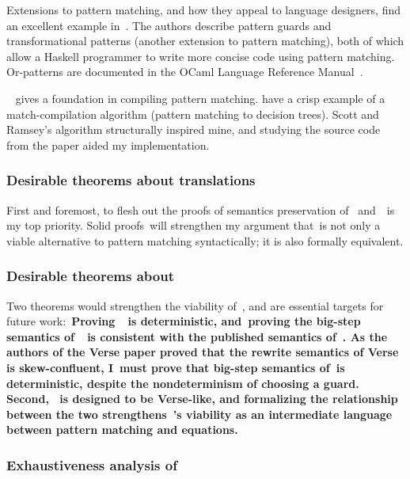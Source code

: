 \documentclass[manuscript,screen 12pt, nonacm]{acmart}
\begin{document}
    Extensions to pattern matching, and how they appeal to language designers,
    find an excellent example in~\citet{guardproposal}. The authors describe
    pattern guards and transformational patterns (another extension to pattern
    matching), both of which allow a Haskell programmer to write more concise
    code using pattern matching. Or-patterns are documented in the OCaml
    Language Reference Manual~\citep{ocaml}.
    
    \citet{augustsson1985compiling}~ gives a foundation in compiling pattern
    matching. \citet{scottramsey} have a crisp example of a match-compilation
    algorithm (pattern matching to decision trees). Scott and Ramsey's algorithm
    structurally inspired mine, and studying the source code from the paper
    aided my implementation. 

    \subsubsection{Desirable theorems about translations}
    First and foremost, to flesh out the proofs of semantics preservation of
    \PTran\ and~\DTran\ is my top priority. Solid proofs~will strengthen my
    argument that~\VMinus is not only a viable alternative to pattern
    matching syntactically; it is also formally equivalent. 

    \subsubsection{Desirable theorems about~\VMinus}
    Two theorems would strengthen the viability of~\VMinus, and are
    essential targets for future work:~\bf{Proving~\VMinus~is
    deterministic}, and~\bf{proving the big-step semantics of~\VMinus~is
    consistent with the published semantics of~\VC.} As the authors of the
    Verse paper proved that the rewrite semantics of Verse is
    skew-confluent, I~must prove that big-step semantics of~\VMinus is
    deterministic, despite the nondeterminism of choosing a guard. Second,
    \VMinus~is designed to be Verse-like, and formalizing the relationship
    between the two strengthens~\VMinus's viability as an intermediate
    language between pattern matching and equations. 


    \subsubsection{Exhaustiveness analysis of~\VMinus}
    \label{typingppandvm}
\end{document}
